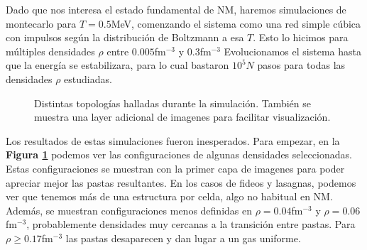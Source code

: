Dado que nos interesa el estado fundamental de NM, haremos simulaciones de montecarlo para $T=0.5$MeV, comenzando el sistema como una red simple cúbica con impulsos según la distribución de Boltzmann
a esa $T$.
Esto lo hicimos para múltiples densidades $\rho$ entre $0.005$fm$^{-3}$ y $0.3$fm$^{-3}$
Evolucionamos el sistema hasta que la energía se estabilizara, para lo cual bastaron $10^5N$ pasos para todas las densidades $\rho$ estudiadas.

\newpage
\begin{figure}[H]
	\centering
	\hspace{0.03\columnwidth}
	\hspace{0.03\columnwidth}
	\hspace{0.03\columnwidth}
	\hspace{0.03\columnwidth}
	\hspace{0.03\columnwidth}
	\hspace{0.03\columnwidth}
	\caption{Distintas topologías halladas durante la simulación.
	También se muestra una layer adicional de imagenes para facilitar visualización.}
	\label{fig:pastas_x1}
\end{figure}

Los resultados de estas simulaciones fueron inesperados.
Para empezar, en la \textbf{Figura \ref{fig:pastas_x1}} podemos ver las configuraciones de algunas densidades seleccionadas.
Estas configuraciones se muestran con la primer capa de imagenes para poder apreciar mejor las pastas resultantes.
En los casos de fideos y lasagnas, podemos ver que tenemos más de una estructura por celda, algo no habitual en NM.
Además, se muestran configuraciones menos definidas en $\rho=0.04$fm$^{-3}$ y $\rho=0.06$fm$^{-3}$, probablemente densidades muy cercanas a la transición entre pastas.
Para $\rho\geq 0.17$fm$^{-3}$ las pastas desaparecen y dan lugar a un gas uniforme. 

